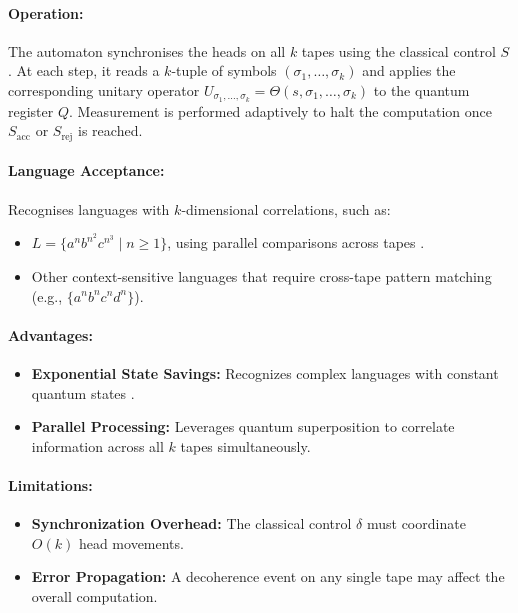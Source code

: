 \paragraph{Operation:}  
The automaton synchronises the heads on all \( k \) tapes using the classical control \( S \). At each step, it reads a \( k \)-tuple of symbols \((\sigma_1, \dots, \sigma_k)\) and applies the corresponding unitary operator \( U_{\sigma_1, \dots, \sigma_k} = \Theta(s, \sigma_1, \dots, \sigma_k) \) to the quantum register \( Q \). Measurement is performed adaptively to halt the computation once \( S_{\text{acc}} \) or \( S_{\text{rej}} \) is reached.

\paragraph{Language Acceptance:}  
Recognises languages with \( k \)-dimensional correlations, such as:
\begin{itemize}
    \item \( L = \{a^n b^{n^2} c^{n^3} \mid n \geq 1\} \), using parallel comparisons across tapes \cite{zheng2012two}.
    \item Other context-sensitive languages that require cross-tape pattern matching (e.g., \( \{a^n b^n c^n d^n\} \)).
\end{itemize}

\paragraph{Advantages:}
\begin{itemize}
    \item \textbf{Exponential State Savings:} Recognizes complex languages with constant quantum states \cite{ambainis2002}.
    \item \textbf{Parallel Processing:} Leverages quantum superposition to correlate information across all \( k \) tapes simultaneously.
\end{itemize}

\paragraph{Limitations:}
\begin{itemize}
    \item \textbf{Synchronization Overhead:} The classical control \( \delta \) must coordinate \( O(k) \) head movements.
    \item \textbf{Error Propagation:} A decoherence event on any single tape may affect the overall computation.
\end{itemize}

